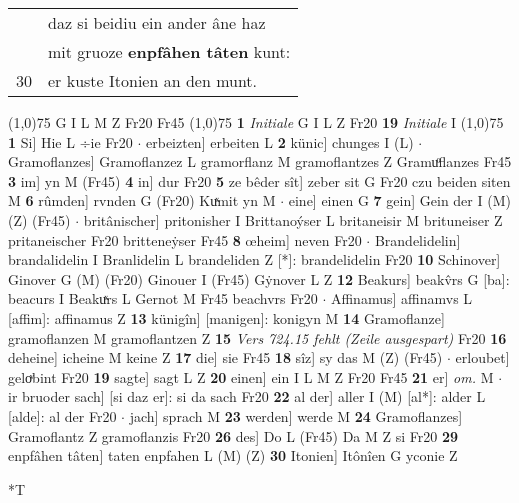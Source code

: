 \documentclass[8pt,a4paper,notitlepage]{article}
\begin{document}
\begin{table}[ht]
\begin{minipage}[t]{0.5\linewidth}
\begin{tabular}{rl}
 & daz si beidiu ein ander âne haz\\ 
 & mit gruoze \textbf{enpfâhen tâten} kunt:\\ 
30 & er kuste Itonien an den munt.\\ 
\end{tabular}
\scriptsize
\line(1,0){75} \newline
G I L M Z Fr20 Fr45 \newline
\line(1,0){75} \newline
\textbf{1} \textit{Initiale} G I L Z Fr20  \textbf{19} \textit{Initiale} I  \newline
\line(1,0){75} \newline
\textbf{1} Si] Hie L ÷ie Fr20  $\cdot$ erbeizten] erbeiten L \textbf{2} künic] chunges I (L)  $\cdot$ Gramoflanzes] Gramoflanzez L gramorflanz M gramoflantzes Z Gramuͦflanzes Fr45 \textbf{3} im] yn M (Fr45) \textbf{4} in] dur Fr20 \textbf{5} ze bêder sît] zeber sit G Fr20 czu beiden siten M \textbf{6} rûmden] rvnden G (Fr20) Kuͯmit yn M  $\cdot$ eine] einen G \textbf{7} gein] Gein der I (M) (Z) (Fr45)  $\cdot$ britânischer] pritonisher I Brittanoýser L britaneisir M brituneiser Z pritaneischer Fr20 britteneẏser Fr45 \textbf{8} œheim] neven Fr20  $\cdot$ Brandelidelin] brandalidelin I Branlidelin L brandeliden Z [*]: brandelidelin Fr20 \textbf{10} Schinover] Ginover G (M) (Fr20) Ginouer I (Fr45) Gẏnover L Z \textbf{12} Beakurs] beakv̂rs G [ba]: beacurs I Beakuͯrs L Gernot M Fr45 beachvrs Fr20  $\cdot$ Affinamus] affinamvs L [affim]: affinamus Z \textbf{13} künigîn] [manigen]: konigyn M \textbf{14} Gramoflanze] gramoflanzen M gramoflantzen Z \textbf{15} \textit{Vers 724.15 fehlt (Zeile ausgespart)} Fr20  \textbf{16} deheine] icheine M keine Z \textbf{17} die] sie Fr45 \textbf{18} sîz] sy das M (Z) (Fr45)  $\cdot$ erloubet] geloͮbint Fr20 \textbf{19} sagte] sagt L Z \textbf{20} einen] ein I L M Z Fr20 Fr45 \textbf{21} er] \textit{om.} M  $\cdot$ ir bruoder sach] [si daz er]: si da sach Fr20 \textbf{22} al der] aller I (M) [al*]: alder  L [alde]: al der Fr20  $\cdot$ jach] sprach M \textbf{23} werden] werde M \textbf{24} Gramoflanzes] Gramoflantz Z gramoflanzis Fr20 \textbf{26} des] Do L (Fr45) Da M Z si Fr20 \textbf{29} enpfâhen tâten] taten enpfahen L (M) (Z) \textbf{30} Itonien] Itônîen G yconie Z \newline
\end{minipage}
\hspace{0.5cm}
\begin{minipage}[t]{0.5\linewidth}
\small
\begin{center}*T

\end{center}
\end{minipage}
\end{table}
\end{document}

